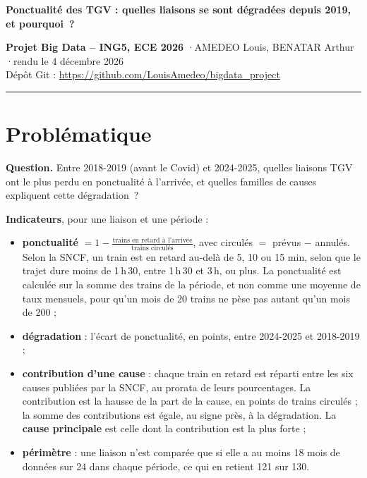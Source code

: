 \documentclass[10pt,a4paper]{article}
\begin{document}
{\raggedright\LARGE\bfseries\color{bleu} Ponctualité des TGV : quelles liaisons se sont dégradées depuis 2019, et pourquoi~?\par}
\vspace{4pt}
\textbf{Projet Big Data -- ING5, ECE 2026} \quad·\quad AMEDEO Louis, BENATAR Arthur \quad·\quad rendu le 4 décembre 2026\\
Dépôt Git : \url{https://github.com/LouisAmedeo/bigdata_project}
\vspace{2pt}\hrule\vspace{4pt}

\section{Problématique}

\textbf{Question.} Entre 2018-2019 (avant le Covid) et 2024-2025, quelles liaisons TGV ont le plus perdu en ponctualité à l'arrivée, et quelles familles de causes expliquent cette dégradation~?

\textbf{Indicateurs}, pour une liaison et une période :
\begin{itemize}
  \item \textbf{ponctualité} $= 1 - \frac{\text{trains en retard à l'arrivée}}{\text{trains circulés}}$, avec circulés $=$ prévus $-$ annulés. Selon la SNCF, un train est en retard au-delà de 5, 10 ou 15 min, selon que le trajet dure moins de 1\,h\,30, entre 1\,h\,30 et 3\,h, ou plus. La ponctualité est calculée sur la somme des trains de la période, et non comme une moyenne de taux mensuels, pour qu'un mois de 20 trains ne pèse pas autant qu'un mois de 200 ;
  \item \textbf{dégradation} : l'écart de ponctualité, en points, entre 2024-2025 et 2018-2019 ;
  \item \textbf{contribution d'une cause} : chaque train en retard est réparti entre les six causes publiées par la SNCF, au prorata de leurs pourcentages. La contribution est la hausse de la part de la cause, en points de trains circulés ; la somme des contributions est égale, au signe près, à la dégradation. La \textbf{cause principale} est celle dont la contribution est la plus forte ;
  \item \textbf{périmètre} : une liaison n'est comparée que si elle a au moins 18 mois de données sur 24 dans chaque période, ce qui en retient 121 sur 130.
\end{itemize}
\end{document}

